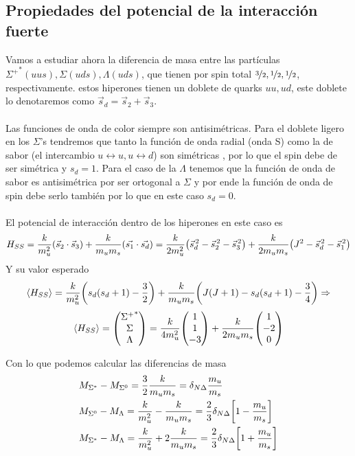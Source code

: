 \subsection{Propiedades del potencial de la interacción fuerte}
Vamos a estudiar ahora la diferencia de masa entre las partículas ${\Sigma^+}^*(uus),\Sigma(uds),\Lambda(uds)$, que tienen por spin total $\nicefrac{3}{2},\nicefrac{1}{2},\nicefrac{1}{2}$, respectivamente.  estos hiperones tienen un doblete de quarks $uu,ud$, este doblete lo denotaremos como $\vec{s}_d=\vec{s}_2+\vec{s}_3$.\\\\
Las funciones de onda de color siempre son antisimétricas. Para el doblete ligero en los $\Sigma$'s tendremos que tanto la función de onda radial (onda S) como la de sabor (el intercambio $u\leftrightarrow u, u \leftrightarrow d$) son simétricas , por lo que el spin debe de ser simétrica y $s_d=1$. Para el caso de la $\Lambda$ tenemos que la función de onda de sabor es antisimétrica por ser ortogonal a $\Sigma$ y por ende la función de onda de spin debe serlo también por lo que en este caso $s_d=0$.
\\\\
El potencial de interacción dentro de los hiperones en este caso es
\begin{equation*}
    H_{SS}=\frac{k}{m_u^2}\qty(\vec{s}_2\cdot \vec{s}_3)+\frac{k}{m_um_s}\qty(\vec{s_1}\cdot \vec{s_d})=\frac{k}{2m_u^2}\qty({\vec{s}_d}^{\,2}-{\vec{s}_2}^{\,2}-{\vec{s}_3}^{\,2})+\frac{k}{2m_um_s}\qty(J^2-{\vec{s}_d}^{\,2}-{\vec{s}_1}^{\,2})
\end{equation*}
Y su valor esperado
\begin{equation*}
    \expval{H_{SS}}=\frac{k}{m_u^2}\qty(s_d(s_d+1)-\frac{3}{2})+\frac{k}{m_um_s}\qty(J(J+1)-s_d(s_d+1)-\frac{3}{4}) \Rightarrow
\end{equation*}
$$\expval{H_{SS}}=\mqty({\Sigma^+}^* \\ \Sigma \\ \Lambda)=\frac{k}{4m_u^2}\mqty(1 \\1 \\-3)+\frac{k}{2m_um_s}\mqty(1\\-2\\0)$$

Con lo que podemos calcular las diferencias de masa
\begin{equation*}
    \begin{aligned}
        &M_{\Sigma^*}-M_{\Sigma^0}=\frac{3}{2}\frac{k}{m_um_s}=\delta_{N\Delta}\frac{m_u}{m_s} \\
        &M_{\Sigma^0}-M_{\Lambda}= \frac{k}{m_u^2}-\frac{k}{m_um_s}=\frac{2}{3 }\delta_{N\Delta}\qty[1-\frac{m_u}{m_s}]\\
        &M_{\Sigma^*}-M_{\Lambda}=\frac{k}{m_u^2}+2\frac{k}{m_um_s}=\frac{2}{3 }\delta_{N\Delta}\qty[1+\frac{m_u}{m_s}]
    \end{aligned}
\end{equation*}

